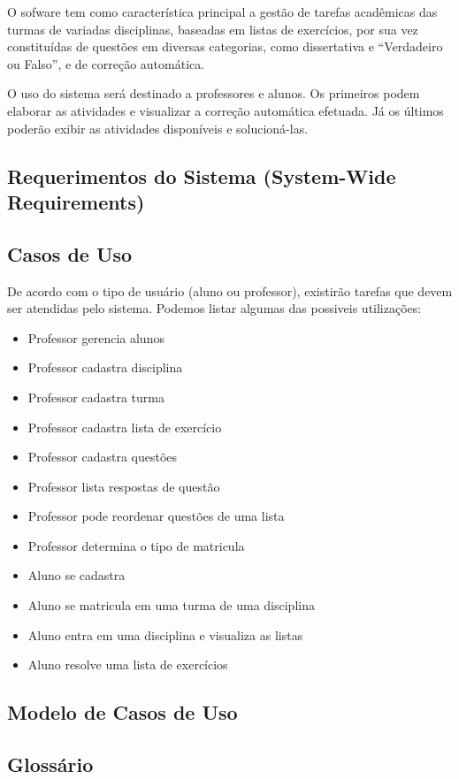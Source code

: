 \documentclass[12pt,letterpaper]{article}
\begin{document}
O sofware tem como característica principal a gestão de tarefas acadêmicas das turmas de variadas disciplinas, baseadas em listas de exercícios, por sua vez constituídas de questões em diversas categorias, como dissertativa e ``Verdadeiro ou Falso'', e de correção automática.

O uso do sistema será destinado a professores e alunos. Os primeiros podem elaborar as atividades e visualizar a correção automática efetuada. Já os últimos poderão exibir as atividades disponíveis e solucioná-las.

\subsection{Requerimentos do Sistema (System-Wide Requirements)}
\subsection{Casos de Uso}
De acordo com o tipo de usuário (aluno ou professor), existirão tarefas que devem ser atendidas pelo sistema. Podemos listar algumas das possiveis utilizações:
\begin{itemize}
\item {Professor gerencia alunos}
\item {Professor cadastra disciplina}
\item {Professor cadastra turma}
\item {Professor cadastra lista de exercício}
\item {Professor cadastra questões}
\item {Professor lista respostas de questão}
\item {Professor pode reordenar questões de uma lista}
\item {Professor determina o tipo de matricula}
\item {Aluno se cadastra}
\item {Aluno se matricula em uma turma de uma disciplina}
\item {Aluno entra em uma disciplina e visualiza as listas}
\item {Aluno resolve uma lista de exercícios}
\end{itemize}

\subsection{Modelo de Casos de Uso}
\subsection{Glossário}
\end{document}

